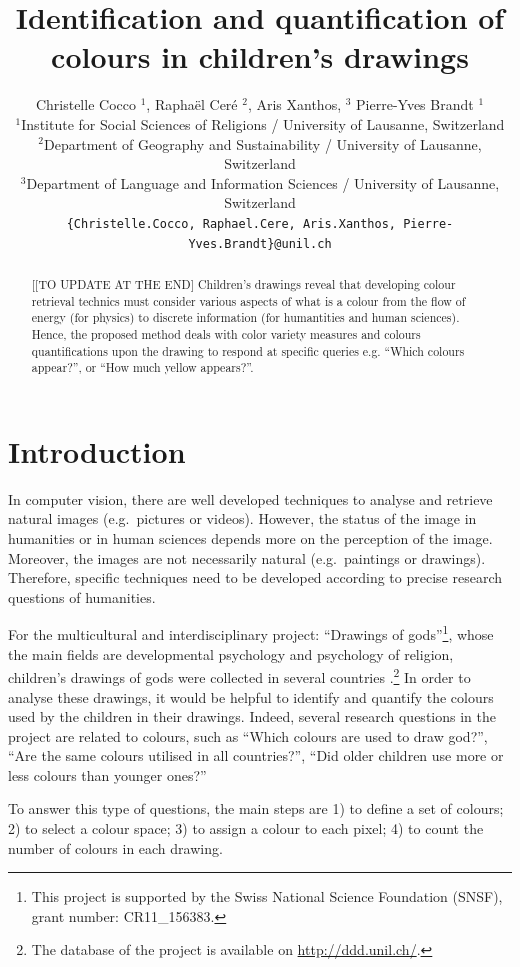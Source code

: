 \documentclass[11pt,a4paper]{article}
\title{Identification and quantification of colours in children's drawings}
\author{Christelle Cocco ${}^1$, Rapha\"el Cer\'e ${}^2$, Aris Xanthos, ${}^3$  Pierre-Yves Brandt ${}^1$\\
  ${}^1$Institute for Social Sciences of Religions / University of Lausanne, Switzerland \\
  ${}^2$Department of Geography and Sustainability / University of Lausanne, Switzerland \\
  ${}^3$Department of Language and Information Sciences / University of Lausanne, Switzerland \\
  {\tt \{Christelle.Cocco, Raphael.Cere, Aris.Xanthos, Pierre-Yves.Brandt\}@unil.ch} \\
  }
\date{}
\begin{document}
\maketitle
\begin{abstract}
{\color{red}[[TO UPDATE AT THE END]}
{\color{gray}Children's drawings reveal that developing colour retrieval technics
must consider various aspects of what is a colour from the flow of
energy (for physics) to discrete information (for humantities and human
sciences). Hence, the proposed method deals with color variety measures
and colours quantifications upon the drawing to respond at specific
queries e.g. ``Which colours appear?'', or ``How much yellow appears?''.}
\end{abstract}


\section{Introduction}\label{introduction}
\label{sec:introduction}

In computer vision, there are well developed techniques to analyse and retrieve natural images (e.g.~pictures or videos). 
However, the status of the image in humanities or in human sciences depends more on the perception of the image. Moreover, the images are not necessarily natural (e.g.~paintings or drawings). Therefore, specific techniques need to be developed according to precise research questions of humanities.

For the multicultural and interdisciplinary project: ``Drawings of gods''\footnote{This project is supported by the Swiss National Science Foundation (SNSF), grant number: CR11\_156383.}, whose the main fields are developmental psychology and psychology of religion, children's drawings of gods were collected in several countries \cite[for more details about this project, see \textit{e.g.}][]{BrandtKagataSpittelerGillieronPaleologue2009,Dandarova2013,DandarovaRobertDessartSerbaevaEtAl2016}.\footnote{The database of the project is available on \url{http://ddd.unil.ch/}.} 
In order to analyse these drawings, it would be helpful to identify and quantify the colours used by the children in their drawings. 
Indeed, several research questions in the project are related to colours, such as ``Which colours are used to draw god?'', ``Are the same colours utilised in all countries?'', ``Did older children use more or less colours than younger ones?''

To answer this type of questions, the main steps are 1) to define a set of colours; 2) to select a colour space; 3) to assign a colour to each pixel; 4) to count the number of colours in each drawing.
\end{document}
